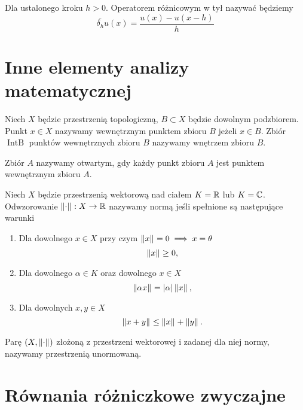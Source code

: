 \documentclass[12pt,a4paper]{report}
\begin{document}
\begin{definition}\label{operator_wtyl}
Dla ustalonego kroku $h>0$. Operatorem różnicowym w tył nazywać będziemy 
$$
\overline{\delta_h} u(x) = \frac{u(x)-u(x-h)}{h} 
$$
\end{definition}


\section{Inne elementy analizy matematycznej}

\begin{definition}
Niech $X$ będzie przestrzenią topologiczną, $B \subset X $ będzie dowolnym podzbiorem. Punkt $x \in X$ nazywamy wewnętrznym punktem zbioru $B$ jeżeli $x \in B$. Zbiór $\operatorname{IntB}$ punktów wewnętrznych zbioru $B$ nazywamy wnętrzem zbioru $B$. 
\end{definition}
\begin{definition} 
Zbiór $A$ nazywamy otwartym, gdy każdy punkt zbioru $A$ jest punktem wewnętrznym zbioru $A$. 
\end{definition}

\begin{definition}
Niech $X$ będzie przestrzenią wektorową nad ciałem $K =\mathbb{R} $ lub $ K = \mathbb{C} $. Odwzorowanie $\left\| {\cdot} \right\|_{}: X \to \mathbb{R}$ nazywamy normą jeśli spełnione są następujące warunki 
\begin{enumerate}
\item Dla dowolnego $x\in X$ przy czym  $  \left\| {x} \right\|_{} = 0 \implies x = \theta$
$$
\left\| {x} \right\|_{} \geq 0 ,
$$
\item Dla dowolnego $\alpha \in K$ oraz dowolnego $x \in X$ 
$$
\left\| {\alpha x} \right\|_{}  = {\left| {\alpha} \right|}  \left\| {x} \right\|_{},
$$
\item Dla dowolnych $x,y\in X$
$$
 \left\| {x+y} \right\|_{} \leq \left\| {x} \right\|_{} + \left\| {y} \right\|_{}.
$$
\end{enumerate}
Parę $ (X, \left\| {\cdot} \right\|_{})$ złożoną z przestrzeni wektorowej i zadanej dla niej normy, nazywamy przestrzenią unormowaną. 
\end{definition}

\section{Równania różniczkowe zwyczajne}
\end{document}

